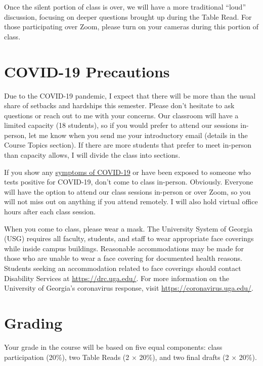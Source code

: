 \documentclass[11pt, letterpaper]{article}
\begin{document}
Once the silent portion of class is over, we will have a more traditional ``loud'' discussion, focusing on deeper questions brought up during the Table Read. For those participating over Zoom, please turn on your cameras during this portion of class. 

\section*{COVID-19 Precautions}

Due to the COVID-19 pandemic, I expect that there will be more than the usual share of setbacks and hardships this semester. Please don't hesitate to ask questions or reach out to me with your concerns. Our classroom will have a limited capacity (18 students), so if you would prefer to attend our sessions in-person, let me know when you send me your introductory email (details in the Course Topics section). If there are more students that prefer to meet in-person than capacity allows, I will divide the class into sections.

If you show any \href{https://www.google.com/search?q=covid-19+symptoms}{symptoms of COVID-19} or have been exposed to someone who tests positive for COVID-19, don't come to class in-person. Obviously. Everyone will have the option to attend our class sessions in-person or over Zoom, so you will not miss out on anything if you attend remotely. I will also hold virtual office hours after each class session.

When you come to class, please wear a mask. The University System of Georgia (USG) requires all faculty, students, and staff to wear appropriate face coverings while inside campus buildings. Reasonable accommodations may be made for those who are unable to wear a face covering for documented health reasons. Students seeking an accommodation related to face coverings should contact Disability Services at \href{https://drc.uga.edu/}{https://drc.uga.edu/}. For more information on the University of Georgia's coronavirus response, visit \href{https://coronavirus.uga.edu/}{https://coronavirus.uga.edu/}. 

\section*{Grading}

Your grade in the course will be based on five equal components: class participation (20\%), two Table Reads (2 $\times$ 20\%), and two final drafts (2 $\times$ 20\%). 
\end{document}
